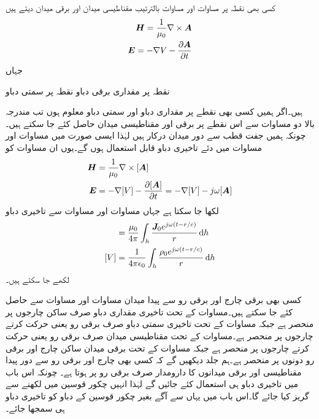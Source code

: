 کسی بھی نقطہ  پر مساوات   اور مساوات  بالترتیب مقناطیسی میدان اور برقی میدان دیتے ہیں
\begin{align}
{\ensuremath{{\boldsymbol{H}}}}=\frac{1}{\mu_0}\nabla \times {\ensuremath{{\boldsymbol{A}}}} \\
{{\boldsymbol{E}}}=-\nabla V-\frac{\partial {\ensuremath{{\boldsymbol{A}}}}}{\partial t}
\end{align}
جہاں
\begin{description}
 نقطہ  پر مقداری برقی دباو
 نقطہ  پر سمتی دباو
\end{description}
ہیں۔اگر ہمیں کسی بھی نقطے پر مقداری دباو  اور سمتی دباو  معلوم ہوں تب مندرجہ بالا دو مساوات سے اس نقطے پر برقی اور مقناطیسی میدان حاصل کئے جا سکتے ہیں۔چونکہ ہمیں  جفت قطب سے دور میدان درکار ہیں لہٰذا ایسی صورت میں مساوات  اور مساوات  میں دئے تاخیری دباو قابل استعمال ہوں گے۔یوں ان مساوات کو
\begin{align}
{\ensuremath{{\boldsymbol{H}}}}&=\frac{1}{\mu_0}\nabla \times [{{\boldsymbol{A}}}] \label{مساوات_اینٹینا_عمومی_مقناطیسی}\\
{{\boldsymbol{E}}}&=-\nabla [V]-\frac{\partial [{{\boldsymbol{A}}}]}{\partial t}=-\nabla [V]-j \omega [{{\boldsymbol{A}}}]\label{مساوات_اینٹینا_عمومی_برقی}
\end{align}
لکھا جا سکتا ہے جہاں مساوات  اور مساوات  سے تاخیری دباو
\begin{align}
[\kvec{A}]&=\frac{\mu_0}{4\pi} \int_h \frac{\kvec{J}_0 e^{j \omega(t-r/c)}}{r} \dif h \label{مساوات_اینٹینا_عمومی_سمتی_دباو}\\
[V]&=\frac{1}{4\pi\epsilon_0}\int_h \frac{\rho_0 e^{j\omega(t-r/c)}}{r} \dif h\label{مساوات_اینٹینا_عمومی_مقداری_دباو}
\end{align}
لکھے جا سکتے ہیں۔

کسی بھی برقی چارج اور برقی رو سے پیدا میدان مساوات  اور مساوات  سے حاصل کئے جا سکتے ہیں۔مساوات  کے تحت تاخیری مقداری دباو  صرف ساکن چارجوں پر منحصر ہے جبکہ مساوات  کے تحت  تاخیری سمتی دباو  صرف برقی رو یعنی حرکت کرتے چارجوں پر منحصر ہے۔مساوات  کے تحت مقناطیسی میدان  صرف برقی رو یعنی حرکت کرتے چارجوں پر منحصر ہے جبکہ مساوات  کے تحت برقی میدان  ساکن چارج اور برقی رو دونوں پر منحصر ہے۔ہم جلد دیکھیں گے کہ کسی بھی چارج اور برقی رو سے  دور پیدا مقناطیسی اور برقی میدانوں کا دارومدار صرف برقی رو پر ہوتا ہے۔ چونکہ اس باب میں تاخیری دباو ہی استعمال کئے جائیں گے لہٰذا انہیں چکور قوسین میں لکھنے سے گریز کیا جائے گا۔اس باب میں یہاں سے آگے بغیر چکور قوسین کے دباو کو تاخیری دباو ہی سمجھا جائے۔

